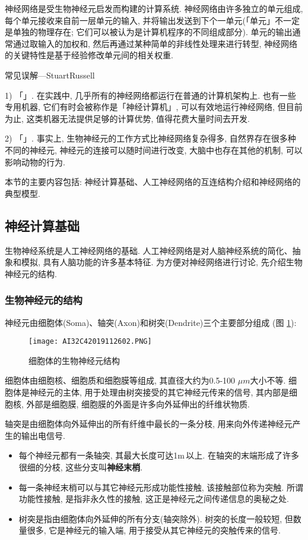 神经网络是受生物神经元启发而构建的计算系统. 神经网络由许多独立的单元组成, 每个单元接收来自前一层单元的输入, 并将输出发送到下个一单元(「单元」不一定是单独的物理存在;
它们可以被认为是计算机程序的不同组成部分). 单元的输出通常通过取输入的加权和, 然后再通过某种简单的非线性处理来进行转型, 神经网络的关键特性是基于经验修改单元间的相关权重.

\textcolor[rgb]{0,0,1}{常见误解---StuartRussell}

1) 「」. 在实践中, 几乎所有的神经网络都运行在普通的计算机架构上. 也有一些专用机器, 它们有时会被称作是「神经计算机」, 可以有效地运行神经网络, 但目前为止, 这类机器无法提供足够的计算优势, 值得花费大量时间去开发.

2) 「」. 事实上, 生物神经元的工作方式比神经网络复杂得多, 自然界存在很多种不同的神经元, 神经元的连接可以随时间进行改变, 大脑中也存在其他的机制, 可以影响动物的行为.

本节的主要内容包括: 神经计算基础、人工神经网络的互连结构介绍和神经网络的典型模型.
\subsection{神经计算基础}
生物神经系统是人工神经网络的基础. 人工神经网络是对人脑神经系统的简化、抽象和模拟, 具有人脑功能的许多基本特征.
为方便对神经网络进行讨论, 先介绍生物神经元的结构.
\subsubsection{生物神经元的结构}
神经元由细胞体(Soma)、轴突(Axon)和树突(Dendrite)三个主要部分组成 (图 \ref{AI32fig2602}):
\begin{figure}[H]
\centering
\texttt{[image: AI32C42019112602.PNG]}
\caption{细胞体的生物神经元结构}
\label{AI32fig2602}
\end{figure}
细胞体由细胞核、细胞质和细胞膜等组成, 其直径大约为0.5-100 $\si{\mu m}$大小不等. 细胞体是神经元的主体, 用于处理由树突接受的其它神经元传来的信号, 其内部是细胞核, 外部是细胞膜, 细胞膜的外面是许多向外延伸出的纤维状物质.

轴突是由细胞体向外延伸出的所有纤维中最长的一条分枝, 用来向外传递神经元产生的输出电信号.
\begin{itemize}
\item 每个神经元都有一条轴突, 其最大长度可达1\si{m}\,以上. 在轴突的末端形成了许多很细的分枝, 这些分支叫\textbf{神经末梢}.
\item 每一条神经末梢可以与其它神经元形成功能性接触, 该接触部位称为突触. 所谓功能性接触, 是指非永久性的接触, 这正是神经元之间传递信息的奥秘之处.
\item 树突是指由细胞体向外延伸的所有分支(轴突除外). 树突的长度一般较短, 但数量很多, 它是神经元的输入端, 用于接受从其它神经元的突触传来的信号.
\end{itemize}
